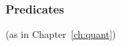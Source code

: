     \subsubsection{Predicates} (as in Chapter~\ref{ch:quant})


  


    






    
    

    

      
